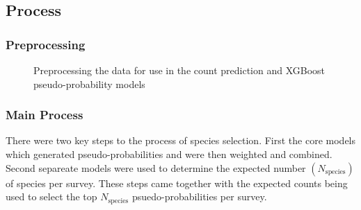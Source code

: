 \subsection{Process}

\subsubsection{Preprocessing}


\begin{figure}\label{fig:preproc}
    \begin{center}
        
        \caption{Preprocessing the data for use in the count prediction and XGBoost pseudo-probability models}
    \end{center}
\end{figure}



\subsubsection{Main Process}
\newcommand{\nspecies}{N_{\text{species}}}

There were two key steps to the process of species selection. First the core models which generated pseudo-probabilities and were then weighted and combined. 
Second separeate models were used to determine the expected number $(\nspecies)$ of species per survey. 
These steps came together with the expected counts being used to select the top  $\nspecies$ psuedo-probabilities per survey.

%         
%         

